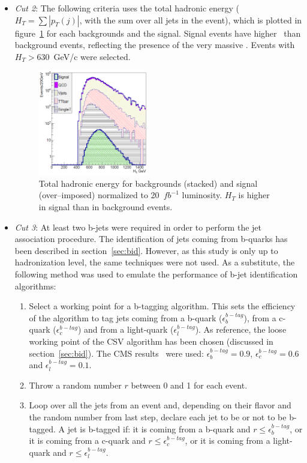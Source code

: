\begin{itemize}
\item \textit{Cut 2}: The following criteria uses the total hadronic energy ($H_{T}=\sum |p_{T}(j)|$, with the sum over all jets in the event), which is plotted in figure~\ref{fig:Var2} for each backgrounds and the signal. Signal events have higher \HT~than background events, reflecting the presence of the very massive \Tp. Events with $H_{T}>630$~GeV/c were selected.

\begin{figure}[!Hhtbp]
  \begin{center}
    \includegraphics[width=0.45\textwidth]{figs/Pheno/HT.png}
    \caption{Total hadronic energy for backgrounds (stacked) and signal (over--imposed) normalized to 20~$fb^{-1}$ luminosity. $H_{T}$ is higher in signal than in background events.}
    \label{fig:Var2}
  \end{center}
\end{figure}

\item \textit{Cut 3}: At least two b-jets were required in order to perform the jet association procedure. The identification of jets coming from b-quarks has been described in section~\ref{sec:bid}. However, as this study is only up to hadronization level, the same techniques were not used. As a substitute, the following method was used to emulate the performance of b-jet identification algorithms:
  \begin{enumerate}
  \item Select a working point for a b-tagging algorithm. This sets the efficiency of the algorithm to tag jets coming from a b-quark ($\epsilon^{b-tag}_{b}$), from a c-quark ($\epsilon^{b-tag}_{c}$) and from a light-quark ($\epsilon^{b-tag}_{l}$). As reference, the loose working point of the CSV algorithm has been chosen (discussed in section~\ref{sec:bid}). The CMS results~\cite{CMS-PAS-BTV-13-001} were used: $\epsilon^{b-tag}_{b}=0.9$, $\epsilon^{b-tag}_{c}=0.6$ and $\epsilon^{b-tag}_{l}=0.1$. 
  \item Throw a random number $r$ between 0 and 1 for each event.
  \item Loop over all the jets from an event and, depending on their flavor and the random number from last step, declare each jet to be or not to be b-tagged. A jet is b-tagged if: it is coming from a b-quark and $r\leq\epsilon^{b-tag}_{b}$, or it is coming from a c-quark and $r\leq\epsilon^{b-tag}_{c}$, or it is coming from a light-quark and $r\leq\epsilon^{b-tag}_{l}$.
  \end{enumerate}


\end{itemize}

